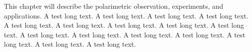 This chapter will describe the polarimetric observation, experiments, and applications. A test long text. A test long text. A test long text. A test long text. A test long text. A test long text. A test long text. A test long text. A test long text. A test long text. A test long text. A test long text. A test long text. A test long text. A test long text. A test long text. 

